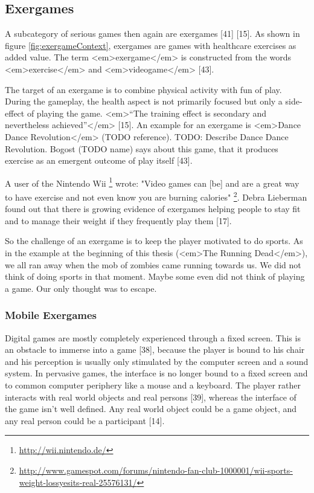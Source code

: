 \subsection{Exergames}
A subcategory of serious games then again are exergames [41] [15]. As shown in figure \ref{fig:exergameContext}, exergames are games with healthcare exercises as added value. The term <em>exergame</em> is constructed from the words <em>exercise</em> and <em>videogame</em> [43].

The target of an exergame is to combine physical activity with fun of play. During the gameplay, the health aspect is not primarily focused but only a side-effect of playing the game. <em>“The training effect is secondary and nevertheless achieved”</em> [15]. An example for an exergame is <em>Dance Dance Revolution</em> (TODO reference). TODO: Describe Dance Dance Revolution. Bogost (TODO name) says about this game, that it produces exercise as an emergent outcome of play itself [43].

A user of the Nintendo Wii \footnote{\url{http://wii.nintendo.de/}} wrote: "Video games can [be] and are a great way to have exercise and not even know you are burning calories" \footnote{\url{http://www.gamespot.com/forums/nintendo-fan-club-1000001/wii-sports-weight-lossyesits-real-25576131/}}. Debra Lieberman found out that there is growing evidence of exergames helping people to stay fit and to manage their weight if they frequently play them [17].

So the challenge of an exergame is to keep the player motivated to do sports. As in the example at the beginning of this thesis (<em>The Running Dead</em>), we all ran away when the mob of zombies came running towards us. We did not think of doing sports in that moment. Maybe some even did not think of playing a game. Our only thought was to escape.

\subsubsection{Mobile Exergames}
Digital games are mostly completely experienced through a fixed screen. This is an obstacle to immerse into a game [38], because the player is bound to his chair and his perception is usually only stimulated by the computer screen and a sound system. In pervasive games, the interface is no longer bound to a fixed screen and to common computer periphery like a mouse and a keyboard. The player rather interacts with real world objects and real persons [39], whereas the interface of the game isn’t well defined. Any real world object could be a game object, and any real person could be a participant [14].

